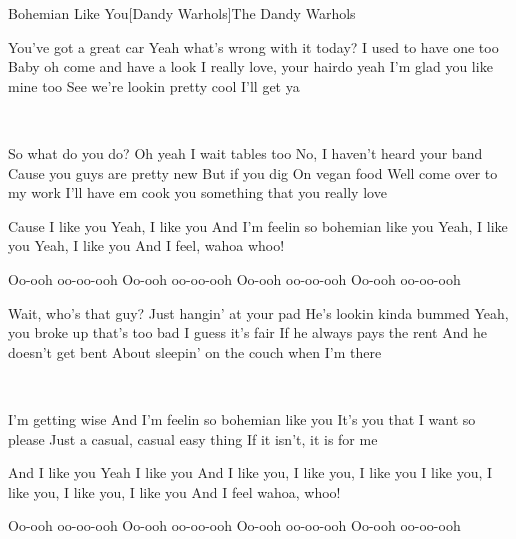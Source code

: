 \begin{Song}{Bohemian Like You}[Dandy Warhols]{The Dandy Warhols}
\begin{multicols}{2}

\begin{Verse}
You've got a great car
Yeah what's wrong with it today?
I used to have one too
Baby oh come and have a look
I really love, your hairdo yeah
I'm glad you like mine too
See we're lookin pretty cool
I'll get ya
\end{Verse}
\espaceInterStrophe

\\
\espaceInterStrophe

\begin{Verse}
So what do you do?
Oh yeah I wait tables too
No, I haven't heard your band
Cause you guys are pretty new
But if you dig
On vegan food
Well come over to my work
I'll have em cook you something that you really love
\end{Verse}
\espaceInterStrophe

\begin{Chorus}
Cause I like you
Yeah, I like you
And I'm feelin so bohemian like you
Yeah, I like you
Yeah, I like you
And I feel, wahoa whoo!
\espaceInterStrophe

Oo-ooh oo-oo-ooh
Oo-ooh oo-oo-ooh
Oo-ooh oo-oo-ooh
Oo-ooh oo-oo-ooh
\end{Chorus}
\columnbreak

\begin{Verse}
Wait, who's that guy?
Just hangin' at your pad
He's lookin kinda bummed
Yeah, you broke up that's too bad
I guess it's fair
If he always pays the rent
And he doesn't get bent
About sleepin' on the couch when I'm there
\end{Verse}
\espaceInterStrophe

\tochorus\\
\espaceInterStrophe

\begin{Verse}
I'm getting wise
And I'm feelin so bohemian like you
It's you that I want so please
Just a casual, casual easy thing
If it isn't, it is for me
\end{Verse}
\espaceInterStrophe

\begin{Chorus}
And I like you
Yeah I like you
And I like you, I like you, I like you
I like you, I like you, I like you, I like you
And I feel wahoa, whoo!
\espaceInterStrophe

Oo-ooh oo-oo-ooh
Oo-ooh oo-oo-ooh
Oo-ooh oo-oo-ooh
Oo-ooh oo-oo-ooh
\end{Chorus}
\vfill
~
\end{multicols}


\end{Song}
